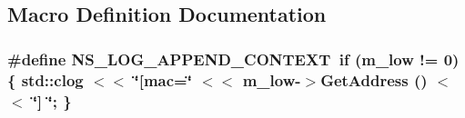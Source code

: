 \subsection{Macro Definition Documentation}
\subsubsection[{\texorpdfstring{N\+S\+\_\+\+L\+O\+G\+\_\+\+A\+P\+P\+E\+N\+D\+\_\+\+C\+O\+N\+T\+E\+XT}{NS_LOG_APPEND_CONTEXT}}]{\setlength{\rightskip}{0pt plus 5cm}\#define N\+S\+\_\+\+L\+O\+G\+\_\+\+A\+P\+P\+E\+N\+D\+\_\+\+C\+O\+N\+T\+E\+XT~{\bf if} (m\+\_\+low != 0) \{ std\+::clog $<$$<$ \char`\"{}\mbox{[}mac=\char`\"{} $<$$<$ m\+\_\+low-\/$>$Get\+Address () $<$$<$ \char`\"{}\mbox{]} \char`\"{}; \}}\hypertarget{dca-txop_8cc_abe50035652d407c40bdaef78214c4955}{}\label{dca-txop_8cc_abe50035652d407c40bdaef78214c4955}
